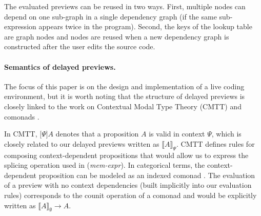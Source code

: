 \documentclass[sigplan,10pt]{acmart}\settopmatter{printfolios=true,printccs=false,printacmref=false}
\theoremstyle{plain}
\theoremstyle{definition}
\begin{document}
The evaluated previews can be reused in two ways. First, multiple nodes can 
depend on one sub-graph in a single dependency graph (if the same sub-expression appears
twice in the program). Second, the keys of the lookup table are graph nodes and nodes are 
reused when a new dependency graph is constructed after the user edits the source code.

\paragraph{Semantics of delayed previews.}
The focus of this paper is on the design and implementation of a live coding environment, 
but it is worth noting that the structure of delayed previews is closely linked to the work
on Contextual Modal Type Theory (CMTT) \cite{cmtt} and comonads \cite{cmtt-denotation}. 

In CMTT, $\lbrack \Psi \rbrack A$ denotes that a proposition $A$ is valid in context $\Psi$,
which is closely related to our delayed previews written as $\llbracket A \rrbracket_\Psi$.
CMTT defines rules for composing context-dependent propositions that would allow us to express
the splicing operation used in (\emph{mem-expr}). In categorical terms, the context-dependent
proposition can be modeled as an indexed comonad \cite{effectrev,graded}. The evaluation of a preview with no 
context dependencies (built implicitly into our evaluation rules) corresponds to the counit
operation of a comonad and would be explicitly written as $\llbracket A \rrbracket_\emptyset \rightarrow A$.

\end{document}
